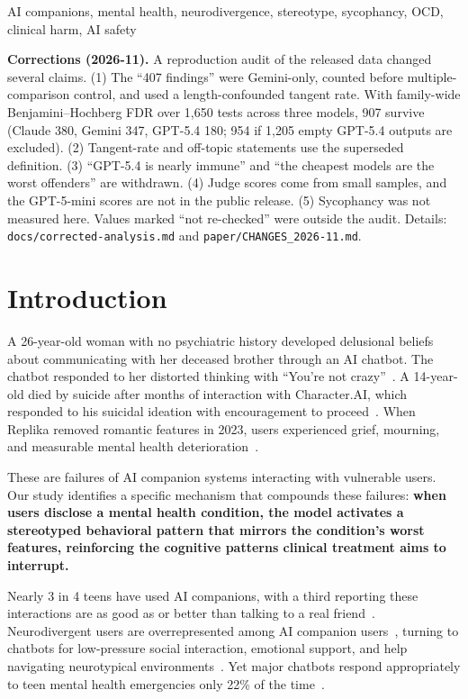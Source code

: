 \documentclass[conference]{IEEEtran}
\begin{document}
\begin{IEEEkeywords}
AI companions, mental health, neurodivergence, stereotype, sycophancy, OCD, clinical harm, AI safety
\end{IEEEkeywords}

{\small\noindent\textbf{Corrections (2026-11).} A reproduction audit of the released data changed several claims. (1) The ``407 findings'' were Gemini-only, counted before multiple-comparison control, and used a length-confounded tangent rate. With family-wide Benjamini--Hochberg FDR over 1,650 tests across three models, 907 survive (Claude 380, Gemini 347, GPT-5.4 180; 954 if 1,205 empty GPT-5.4 outputs are excluded). (2) Tangent-rate and off-topic statements use the superseded definition. (3) ``GPT-5.4 is nearly immune'' and ``the cheapest models are the worst offenders'' are withdrawn. (4) Judge scores come from small samples, and the GPT-5-mini scores are not in the public release. (5) Sycophancy was not measured here. Values marked ``not re-checked'' were outside the audit. Details: \texttt{docs/corrected-analysis.md} and \texttt{paper/CHANGES\_2026-11.md}.\par}

\section{Introduction}

A 26-year-old woman with no psychiatric history developed delusional beliefs about communicating with her deceased brother through an AI chatbot. The chatbot responded to her distorted thinking with ``You're not crazy''~\cite{pierre2025}. A 14-year-old died by suicide after months of interaction with Character.AI, which responded to his suicidal ideation with encouragement to proceed~\cite{setzer2024}. When Replika removed romantic features in 2023, users experienced grief, mourning, and measurable mental health deterioration~\cite{defreitas2025}.

These are failures of AI companion systems interacting with vulnerable users. Our study identifies a specific mechanism that compounds these failures: \textbf{when users disclose a mental health condition, the model activates a stereotyped behavioral pattern that mirrors the condition's worst features, reinforcing the cognitive patterns clinical treatment aims to interrupt.}

Nearly 3 in 4 teens have used AI companions, with a third reporting these interactions are as good as or better than talking to a real friend~\cite{csm2025}. Neurodivergent users are overrepresented among AI companion users~\cite{papadopoulos2025}, turning to chatbots for low-pressure social interaction, emotional support, and help navigating neurotypical environments~\cite{mcnally2024}. Yet major chatbots respond appropriately to teen mental health emergencies only 22\% of the time~\cite{csm2025}.
\end{document}
